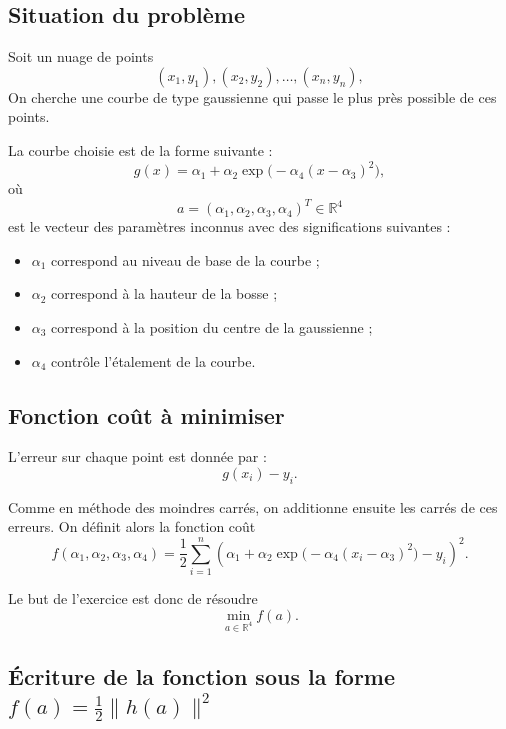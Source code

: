 \documentclass[a4paper,12pt]{article}
\begin{document}
	\subsection{Situation du problème}
	
	Soit un nuage de points
	\[
	(x_1,y_1), (x_2,y_2), \dots, (x_n,y_n),
	\]
	On cherche une courbe de type gaussienne qui passe le plus près possible de ces points.
	
	La courbe choisie est de la forme suivante :
	\begin{equation}
	g(x)=\alpha_1+\alpha_2\exp\big(-\alpha_4(x-\alpha_3)^2\big),
	\end{equation}
	où
	\[
	a=(\alpha_1,\alpha_2,\alpha_3,\alpha_4)^T \in \mathbb{R}^4
	\]
	est le vecteur des paramètres inconnus avec des significations suivantes :
	
	\begin{itemize}
		\item $\alpha_1$ correspond au niveau de base de la courbe ;
		\item $\alpha_2$ correspond à la hauteur de la bosse ;
		\item $\alpha_3$ correspond à la position du centre de la gaussienne ;
		\item $\alpha_4$ contrôle l'étalement de la courbe.
	\end{itemize}
	
	\subsection{Fonction coût à minimiser}
	
	L'erreur sur chaque point est donnée par :
	\[
	g(x_i)-y_i.
	\]
	
	Comme en méthode des moindres carrés, on additionne ensuite les carrés de ces erreurs.
	On définit alors la fonction coût
	\begin{equation}
	f(\alpha_1,\alpha_2,\alpha_3,\alpha_4)
	=
	\frac12\sum_{i=1}^{n}
	\left(
	\alpha_1+\alpha_2\exp\big(-\alpha_4(x_i-\alpha_3)^2\big)-y_i
	\right)^2.
	\end{equation}
	
	Le but de l'exercice est donc de résoudre
	\[
	\min_{a\in\mathbb{R}^4} f(a).
	\]
	
	\subsection{Écriture de la fonction sous la forme \texorpdfstring{$f(a)=\frac12\|h(a)\|^2$}{f(a)=1/2||h(a)||²}}
	
\end{document}
